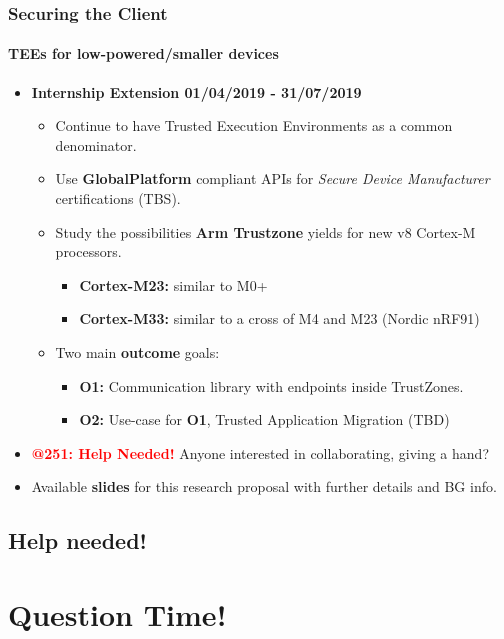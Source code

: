\documentclass[10pt,    %
    english,            %
    xcolor=table,       %
    envcountsect,        %
    aspectratio=169     %
]{beamer}
\begin{document}
\begin{frame}
    \frametitle{Securing the Client}
    \framesubtitle{TEEs for low-powered/smaller devices}

    \vspace{-20pt}

    \begin{itemize}
        \item \textbf{Internship Extension 01/04/2019 - 31/07/2019}
        \begin{itemize}
            \item Continue to have Trusted Execution Environments as a common denominator.
            \item Use \textbf{\textcolor{fgRed}{GlobalPlatform}} compliant APIs for \textit{Secure Device Manufacturer} certifications (TBS).
            \item Study the possibilities \textbf{Arm Trustzone} yields for new v8 Cortex-M processors.
            \begin{itemize}
                \item \textbf{Cortex-M23:} similar to M0+
                \item \textbf{\textcolor{fgRed}{Cortex-M33:}} similar to a cross of M4 and M23 (Nordic nRF91)
            \end{itemize}
            \item Two main \textbf{\textcolor{fgRed}{outcome}} goals:
            \begin{itemize}
                \item \textbf{O1:} Communication library with endpoints inside TrustZones.
                \item \textbf{O2:} Use-case for \textbf{O1}, Trusted Application Migration (TBD)
            \end{itemize}
        \end{itemize}
        \item \textbf{\textcolor{red}{@251: Help Needed!}} Anyone interested in collaborating, giving a hand?
        \item Available \textbf{\textcolor{fgRed}{slides}} for this research proposal with further details and BG info.
    \end{itemize}

\end{frame}

\subsection{Help needed!}

\section{Question Time!}
\sectionframe
\end{document}
